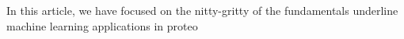 In this article, we have focused on the nitty-gritty of the fundamentals underline machine learning applications in proteo